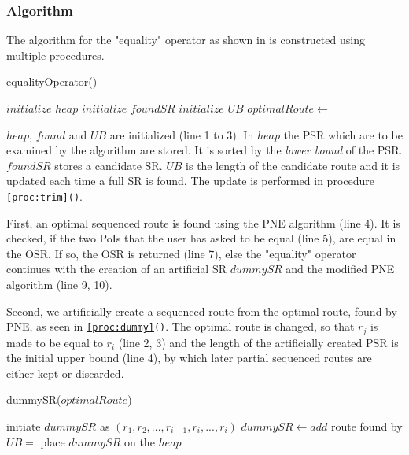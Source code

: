 \subsubsection{Algorithm}

The algorithm for the "equality" operator as shown in \texttt{} is constructed using multiple procedures.

\begin{algorithm}[htb!]
\caption{equalityOperator()}
\label{alg:equality}
	
	
	\BlankLine
	
	$initialize$ $heap$ 
	$initialize$ $foundSR$ 
	$initialize$ $UB$\; 
	$optimalRoute \leftarrow$\;
	{
		\dummySR{}\;
		\modifiedPNE{}\;
	}

\end{algorithm}

$heap$, $found$ and $UB$ are initialized (line 1 to 3). In $heap$ the PSR which are to be examined by the algorithm are stored. It is sorted by the \textit{lower bound} of the PSR. $foundSR$ stores a candidate SR. $UB$ is the length of the candidate route and it is updated each time a full SR is found. The update is performed in procedure \texttt{\ref{proc:trim}()}.

First, an optimal sequenced route is found using the PNE algorithm (line 4). It is checked, if the two PoIs that the user has asked to be equal (line 5), are equal in the OSR. If so, the OSR is returned (line 7), else the "equality" operator continues with the creation of an artificial SR $dummySR$ and the modified PNE algorithm (line 9, 10). 

Second, we artificially create a sequenced route from the optimal route, found by PNE, as seen in \texttt{\ref{proc:dummy}()}. The optimal route is changed, so that $r_j$ is made to be equal to $r_i$ (line 2, 3) and the length of the artificially created PSR is the initial upper bound (line 4), by which later partial sequenced routes are either kept or discarded.

\begin{procedure}[htb!]
\caption{dummySR($optimalRoute$)}
\label{proc:dummy}
	
	initiate $dummySR$ as $(r_1, r_2, ..., r_{i-1}, r_i, ..., r_i)$ 
	$dummySR \leftarrow add$ route found by \;
	$UB =$ \;
	place $dummySR$ on the $heap$\;
\end{procedure}

